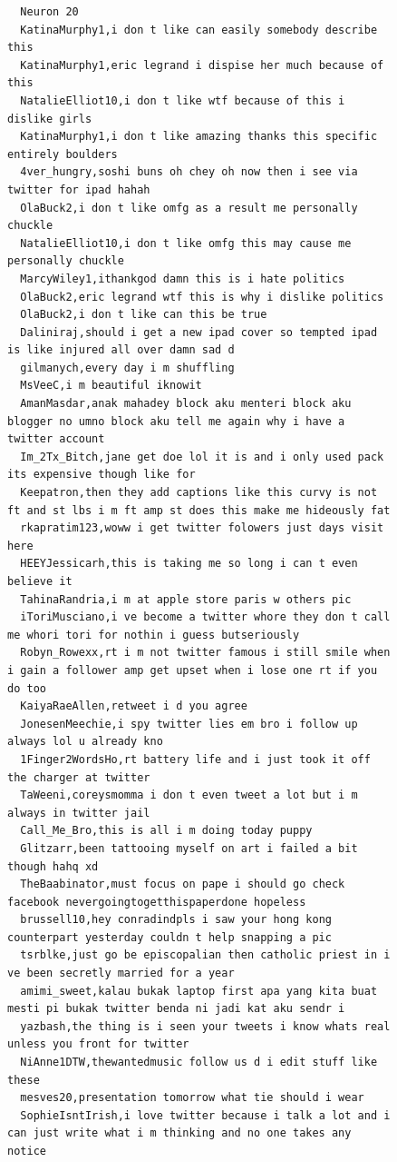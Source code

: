 \begin{figure}[htpb]
\begin{verbatim}
  Neuron 20
  KatinaMurphy1,i don t like can easily somebody describe this
  KatinaMurphy1,eric legrand i dispise her much because of this
  NatalieElliot10,i don t like wtf because of this i dislike girls
  KatinaMurphy1,i don t like amazing thanks this specific entirely boulders
  4ver_hungry,soshi buns oh chey oh now then i see via twitter for ipad hahah
  OlaBuck2,i don t like omfg as a result me personally chuckle
  NatalieElliot10,i don t like omfg this may cause me personally chuckle
  MarcyWiley1,ithankgod damn this is i hate politics
  OlaBuck2,eric legrand wtf this is why i dislike politics
  OlaBuck2,i don t like can this be true
  Daliniraj,should i get a new ipad cover so tempted ipad is like injured all over damn sad d
  gilmanych,every day i m shuffling
  MsVeeC,i m beautiful iknowit
  AmanMasdar,anak mahadey block aku menteri block aku blogger no umno block aku tell me again why i have a twitter account
  Im_2Tx_Bitch,jane get doe lol it is and i only used pack its expensive though like for
  Keepatron,then they add captions like this curvy is not ft and st lbs i m ft amp st does this make me hideously fat
  rkapratim123,woww i get twitter folowers just days visit here
  HEEYJessicarh,this is taking me so long i can t even believe it
  TahinaRandria,i m at apple store paris w others pic
  iToriMusciano,i ve become a twitter whore they don t call me whori tori for nothin i guess butseriously
  Robyn_Rowexx,rt i m not twitter famous i still smile when i gain a follower amp get upset when i lose one rt if you do too
  KaiyaRaeAllen,retweet i d you agree
  JonesenMeechie,i spy twitter lies em bro i follow up always lol u already kno
  1Finger2WordsHo,rt battery life and i just took it off the charger at twitter
  TaWeeni,coreysmomma i don t even tweet a lot but i m always in twitter jail
  Call_Me_Bro,this is all i m doing today puppy
  Glitzarr,been tattooing myself on art i failed a bit though hahq xd
  TheBaabinator,must focus on pape i should go check facebook nevergoingtogetthispaperdone hopeless
  brussell10,hey conradindpls i saw your hong kong counterpart yesterday couldn t help snapping a pic
  tsrblke,just go be episcopalian then catholic priest in i ve been secretly married for a year
  amimi_sweet,kalau bukak laptop first apa yang kita buat mesti pi bukak twitter benda ni jadi kat aku sendr i
  yazbash,the thing is i seen your tweets i know whats real unless you front for twitter
  NiAnne1DTW,thewantedmusic follow us d i edit stuff like these
  mesves20,presentation tomorrow what tie should i wear
  SophieIsntIrish,i love twitter because i talk a lot and i can just write what i m thinking and no one takes any notice

\end{verbatim}
\end{figure}
